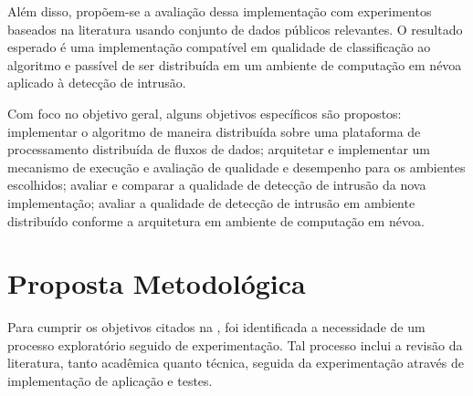 Além disso, propõem-se a avaliação dessa implementação com experimentos
baseados na literatura usando conjunto de dados públicos relevantes.
O resultado esperado é uma implementação compatível em qualidade de
classificação ao algoritmo \minas e passível de ser distribuída em um ambiente de
computação em névoa aplicado à detecção de intrusão.

Com foco no objetivo geral, alguns objetivos específicos são propostos:
implementar o algoritmo \minas de maneira distribuída sobre uma plataforma de
processamento distribuída de fluxos de dados;
arquitetar e implementar um mecanismo de execução e avaliação de qualidade e
desempenho para os ambientes escolhidos;
avaliar e comparar a qualidade de detecção de intrusão da nova implementação;
avaliar a qualidade de detecção de intrusão em ambiente distribuído conforme a
arquitetura \arch em ambiente de computação em névoa.



\section{Proposta Metodológica}

Para cumprir os objetivos citados na , foi identificada a necessidade
de um processo exploratório seguido de experimentação. Tal processo inclui a
revisão da literatura, tanto acadêmica quanto técnica, seguida da experimentação
através de implementação de aplicação e testes.

